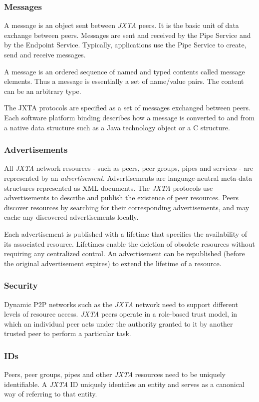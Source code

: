 \subsubsection{Messages}
A message is an object sent between \emph{JXTA} peers. It is the basic unit of data exchange between peers. Messages are sent and received by the Pipe Service and by the Endpoint Service. Typically, applications use the Pipe Service to create, send and receive messages. 

A message is an ordered sequence of named and typed contents called message elements. Thus a message is essentially a set of name/value pairs. The content can be an arbitrary type. 

The JXTA protocols are specified as a set of messages exchanged between peers. Each software platform binding describes how a message is converted to and from a native data structure such as a Java technology object or a C structure. 

\subsubsection{Advertisements}
All \emph{JXTA} network resources - such as peers, peer groups, pipes and services - are represented by an \emph{advertisement}. Advertisements are language-neutral meta-data structures represented as XML documents. The \emph{JXTA} protocols use advertisements to describe and publish the existence of peer resources. Peers discover resources by searching for their corresponding advertisements, and may cache any discovered advertisements locally.

Each advertisement is published with a lifetime that specifies the availability of its associated resource. Lifetimes enable the deletion of obsolete resources without requiring any centralized control. An advertisement can be republished (before the original advertisement expires) to extend the lifetime of a resource.

\subsubsection{Security}
Dynamic P2P networks such as the \emph{JXTA} network need to support different levels of resource access. \emph{JXTA} peers operate in a role-based trust model, in which an individual peer acts under the authority granted to it by another trusted peer to perform a particular task. 

\subsubsection{IDs}
Peers, peer groups, pipes and other \emph{JXTA} resources need to be uniquely identifiable. A \emph{JXTA} ID uniquely identifies an entity and serves as a canonical way of referring to that entity. 



